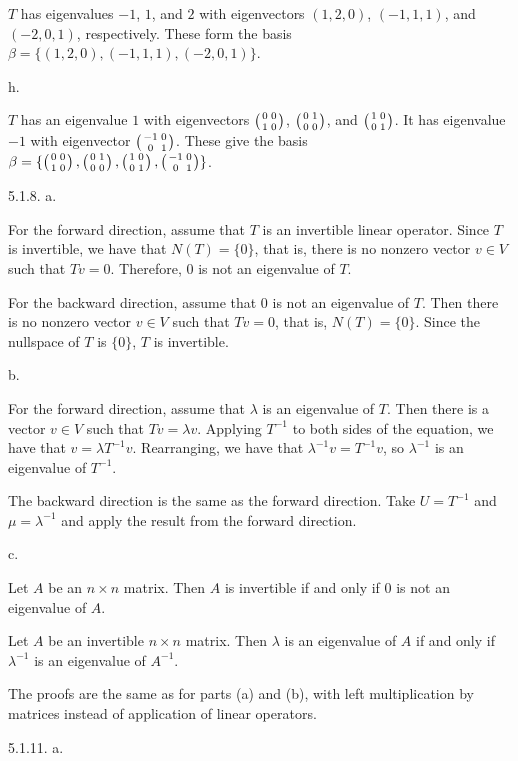 $T$ has eigenvalues $-1$, $1$, and $2$ with eigenvectors
$(1,2,0)$, $(-1,1,1)$, and $(-2,0,1)$, respectively.
These form the basis $\beta = \{(1,2,0), (-1,1,1), (-2,0,1)\}$.
\medskip
\item{} h.

$T$ has an eigenvalue $1$ with eigenvectors
$\left( {0 \atop 1} {0 \atop 0} \right)$,
$\left( {0 \atop 0} {1 \atop 0} \right)$, and
$\left( {1 \atop 0} {0 \atop 1} \right)$.
It has eigenvalue $-1$ with eigenvector
$\left( {-1 \atop 0} {0 \atop 1} \right)$.
These give the basis $\beta = \{ \left( {0 \atop 1} {0 \atop 0} \right),
\left( {0 \atop 0} {1 \atop 0} \right), \left( {1 \atop 0} {0 \atop 1} \right),
\left( {-1 \atop 0} {0 \atop 1} \right)\}$.
\bigskip
\item{5.1.8.} a.

For the forward direction, assume that $T$ is an invertible linear operator.
Since $T$ is invertible, we have that $N(T) = \{0\}$, that is,
there is no nonzero vector $v \in V$ such that $Tv = 0$.
Therefore, $0$ is not an eigenvalue of $T$.

For the backward direction, assume that $0$
is not an eigenvalue of $T$.
Then there is no nonzero vector $v \in V$ such that $Tv = 0$, that is,
$N(T) = \{0\}$.
Since the nullspace of $T$ is $\{0\}$, $T$ is invertible.
\medskip
\item{} b.

For the forward direction, assume that $\lambda$
is an eigenvalue of $T$.
Then there is a vector $v \in V$ such that $Tv = \lambda v$.
Applying $T^{-1}$ to both sides of the equation,
we have that $v = \lambda T^{-1} v$.
Rearranging, we have that $\lambda ^{-1} v = T^{-1} v$,
so $\lambda ^{-1}$ is an eigenvalue of $T^{-1}$.

The backward direction is the same as the forward direction.
Take $U = T^{-1}$ and $\mu = \lambda ^{-1}$
and apply the result from the forward direction.
\medskip
\item{} c.

Let $A$ be an $n \times n$ matrix.
Then $A$ is invertible if and only if $0$ is not an eigenvalue of $A$.

Let $A$ be an invertible $n \times n$ matrix.
Then $\lambda$ is an eigenvalue of $A$ if and only if
$\lambda ^{-1}$ is an eigenvalue of $A^{-1}$.

The proofs are the same as for parts (a) and (b),
with left multiplication by matrices instead of application of linear operators.
\bigskip
\item{5.1.11.} a.

